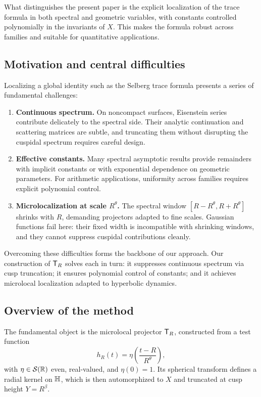 What distinguishes the present paper is the explicit localization of the trace formula in both spectral and geometric variables, with constants controlled polynomially in the invariants of $X$. This makes the formula robust across families and suitable for quantitative applications.

\subsection{Motivation and central difficulties}\label{subsec:difficulties}

Localizing a global identity such as the Selberg trace formula presents a series of fundamental challenges:

\begin{enumerate}
  \item \textbf{Continuous spectrum.} On noncompact surfaces, Eisenstein series contribute delicately to the spectral side. Their analytic continuation and scattering matrices are subtle, and truncating them without disrupting the cuspidal spectrum requires careful design.
  \item \textbf{Effective constants.} Many spectral asymptotic results provide remainders with implicit constants or with exponential dependence on geometric parameters. For arithmetic applications, uniformity across families requires explicit polynomial control.
  \item \textbf{Microlocalization at scale $R^\theta$.} The spectral window $[R-R^\theta,R+R^\theta]$ shrinks with $R$, demanding projectors adapted to fine scales. Gaussian functions fail here: their fixed width is incompatible with shrinking windows, and they cannot suppress cuspidal contributions cleanly.
\end{enumerate}

Overcoming these difficulties forms the backbone of our approach. Our construction of $\mathsf{T}_R$ solves each in turn: it suppresses continuous spectrum via cusp truncation; it ensures polynomial control of constants; and it achieves microlocal localization adapted to hyperbolic dynamics.

\subsection{Overview of the method}\label{subsec:method}

The fundamental object is the microlocal projector $\mathsf{T}_R$, constructed from a test function
\[
   h_R(t) = \eta\!\left(\frac{t-R}{R^\theta}\right),
\]
with $\eta \in \mathcal{S}(\mathbb{R})$ even, real-valued, and $\eta(0)=1$. Its spherical transform defines a radial kernel on $\mathbb{H}$, which is then automorphized to $X$ and truncated at cusp height $Y=R^\beta$.

